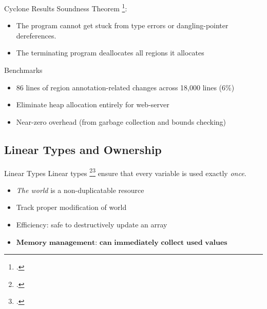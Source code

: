 \documentclass[aspectratio=169]{beamer}
\begin{document}
\begin{frame}{Cyclone Results}
Soundness Theorem \footcite{grossman_formal_2001}:
    \begin{itemize}
        \item The program cannot get stuck from type errors or dangling-pointer dereferences. 
        \item The terminating program deallocates all regions it allocates 
    \end{itemize}
\pause
Benchmarks
    \begin{itemize}
        \item 86 lines of region annotation-related changes across 18,000 lines (6\%) 
        \item Eliminate heap allocation entirely for web-server
        \item Near-zero overhead (from garbage collection and bounds checking)
    \end{itemize}
\end{frame}


\subsection{Linear Types and Ownership}

\begin{frame}{Linear Types}
    Linear types \footcite{girard_linear_1987}\footcite{wadler_linear_1990} ensure that every variable is used exactly \emph{once}.
    \begin{itemize}[<+->]
        \item \emph{The world} is a non-duplicatable resource %
        \item Track proper modification of world %
        \item Efficiency: safe to destructively update an array
        \item $\textbf{Memory management: can immediately collect used values}$ %
    \end{itemize}
\end{frame}
\end{document}
